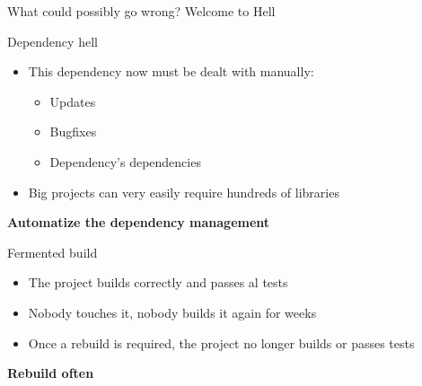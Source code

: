 \documentclass[presentation]{beamer}
\begin{document}
\begin{frame}{What could possibly go wrong? Welcome to Hell }
\begin{block}{Dependency hell}
\begin{itemize}
			\item This dependency now must be dealt with manually:
			\begin{itemize}
				\item Updates
				\item Bugfixes
				\item Dependency's dependencies
			\end{itemize}
			\item Big projects can very easily require hundreds of libraries
		\end{itemize}
		\textbf{Automatize the dependency management}
	\end{block}
	\begin{block}{Fermented build}
		\begin{itemize}
			\item The project builds correctly and passes al tests
			\item Nobody touches it, nobody builds it again for weeks
			\item Once a rebuild is required, the project no longer builds or passes tests
		\end{itemize}
		\textbf{Rebuild often}
	\end{block}
\end{frame}
\end{document}
